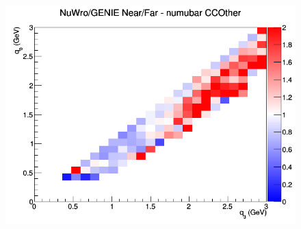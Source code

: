 \documentclass[12pt]{article}
\begin{document}
\begin{figure}[h]
\endminipage
{}
\includegraphics[width=\linewidth]{q0_q3/nominal/ratios/CCOther_NuWro_GENIE_numubar_NF_q3_q0.png}
\endminipage
\newline
\end{figure}
\clearpage
\end{document}
